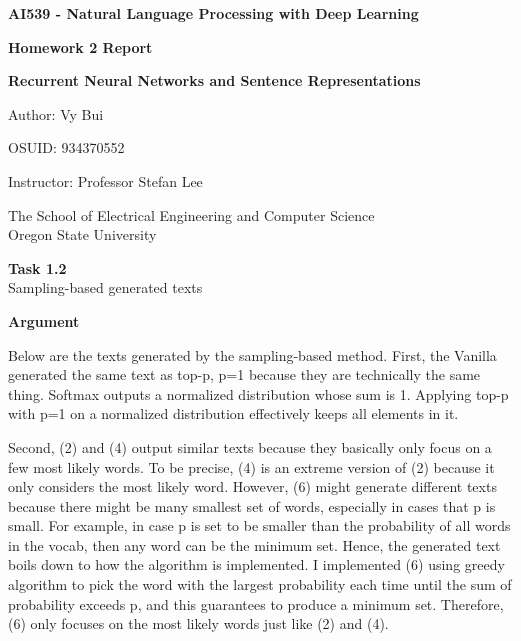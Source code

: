 \documentclass[12pt,article]{article}
\newenvironment{task}[2][Task]
    { \begin{mdframed}[backgroundcolor=gray!20] \textbf{#1 #2} \\}
    {  \end{mdframed}}
\begin{document}
\begin{titlepage}
    \begin{center}
        \vspace*{4cm}

        \textbf{\Large AI539 - Natural Language Processing with Deep Learning}

        \vspace{0.5cm}
 
        \textbf{ Homework 2 Report}

        \textbf{ Recurrent Neural Networks and Sentence Representations }
 
        \vspace{1cm}

        Author: Vy Bui

        OSUID: 934370552

        \vspace{1cm}

        Instructor: Professor Stefan Lee
        \vfill
             
        \vspace{0.8cm}
      
             
        The School of Electrical Engineering and Computer Science\\
        Oregon State University\\
             
    \end{center}
\end{titlepage}


\begin{task}{1.2} 
Sampling-based generated texts
\end{task}
\textbf{Argument}

Below are the texts generated by the sampling-based method. First, the Vanilla generated the same text as top-p, p=1 because they are technically the same thing. Softmax outputs a normalized distribution whose sum is 1. Applying top-p with p=1 on a normalized distribution effectively keeps all elements in it. 

Second, (2) and (4) output similar texts because they basically only focus on a few most likely words. To be precise, (4) is an extreme version of (2) because it only considers the most likely word. However, (6) might generate different texts because there might be many smallest set of words, especially in cases that p is small. For example, in case p is set to be smaller than the probability of all words in the vocab, then any word can be the minimum set. Hence, the generated text boils down to how the algorithm is implemented. I implemented (6) using greedy algorithm to pick the word with the largest probability each time until the sum of probability exceeds p, and this guarantees to produce a minimum set. Therefore, (6) only focuses on the most likely words just like (2) and (4).
\end{document}
